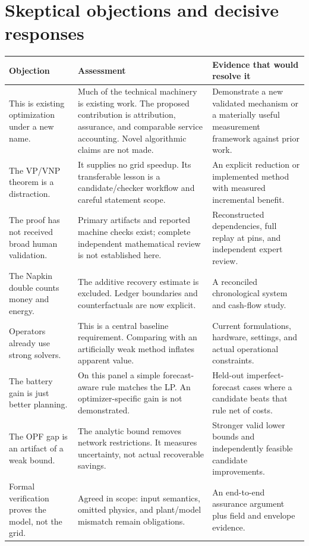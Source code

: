 \documentclass[11pt,letterpaper]{article}
\begin{document}
\section{Skeptical objections and decisive responses}
\label{sec:skeptics}
\begin{longtable}{P{.27\linewidth}P{.38\linewidth}P{.26\linewidth}}
\toprule Objection & Assessment & Evidence that would resolve it\\\midrule\endhead
This is existing optimization under a new name. & Much of the technical machinery is existing work. The proposed contribution is attribution, assurance, and comparable service accounting. Novel algorithmic claims are not made. & Demonstrate a new validated mechanism or a materially useful measurement framework against prior work.\\
The VP/VNP theorem is a distraction. & It supplies no grid speedup. Its transferable lesson is a candidate/checker workflow and careful statement scope. & An explicit reduction or implemented method with measured incremental benefit.\\
The proof has not received broad human validation. & Primary artifacts and reported machine checks exist; complete independent mathematical review is not established here. & Reconstructed dependencies, full replay at pins, and independent expert review.\\
The Napkin double counts money and energy. & The additive recovery estimate is excluded. Ledger boundaries and counterfactuals are now explicit. & A reconciled chronological system and cash-flow study.\\
Operators already use strong solvers. & This is a central baseline requirement. Comparing with an artificially weak method inflates apparent value. & Current formulations, hardware, settings, and actual operational constraints.\\
The battery gain is just better planning. & On this panel a simple forecast-aware rule matches the LP. An optimizer-specific gain is not demonstrated. & Held-out imperfect-forecast cases where a candidate beats that rule net of costs.\\
The OPF gap is an artifact of a weak bound. & The analytic bound removes network restrictions. It measures uncertainty, not actual recoverable savings. & Stronger valid lower bounds and independently feasible candidate improvements.\\
Formal verification proves the model, not the grid. & Agreed in scope: input semantics, omitted physics, and plant/model mismatch remain obligations. & An end-to-end assurance argument plus field and envelope evidence.\\

\end{longtable}
\end{document}
